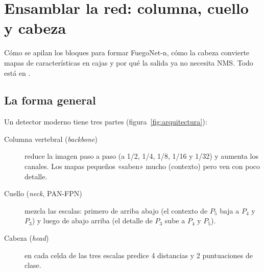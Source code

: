 \chapter{Ensamblar la red: columna, cuello y cabeza}
\label{cap:arquitectura}

\begin{enpocas}
Cómo se apilan los bloques para formar FuegoNet-n, cómo la cabeza convierte
mapas de características en cajas y por qué la salida ya no necesita NMS. Todo
está en .
\end{enpocas}

\section{La forma general}

Un detector moderno tiene tres partes (figura~\ref{fig:arquitectura}):
\begin{description}
  \item[Columna vertebral (\emph{backbone})] reduce la imagen paso a paso
        (a 1/2, 1/4, 1/8, 1/16 y 1/32) y aumenta los canales. Los mapas
        pequeños «saben» mucho (contexto) pero ven con poco detalle.
  \item[Cuello (\emph{neck}, PAN-FPN)] mezcla las escalas: primero de arriba abajo
        (el contexto de $P_5$ baja a $P_4$ y $P_3$) y luego de abajo arriba (el
        detalle de $P_3$ sube a $P_4$ y $P_5$).
  \item[Cabeza (\emph{head})] en cada celda de las tres escalas predice 4 distancias
        y 2 puntuaciones de clase.
\end{description}

